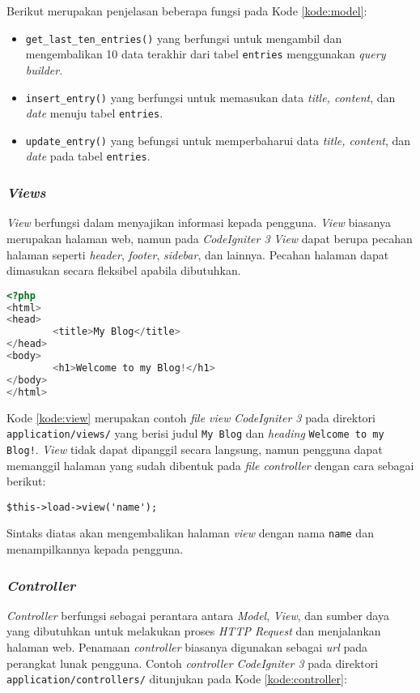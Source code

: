 Berikut merupakan penjelasan beberapa fungsi pada Kode \ref{kode:model}:
\begin{itemize}
\item \verb|get_last_ten_entries()| yang berfungsi untuk mengambil dan mengembalikan 10 data terakhir dari tabel \verb|entries| menggunakan \textit{query builder}.
\item \verb|insert_entry()| yang berfungsi untuk memasukan data \textit{title, content}, dan \textit{date} menuju tabel \verb|entries|.
\item \verb|update_entry()| yang befungsi untuk memperbaharui data \textit{title, content}, dan \textit{date} pada tabel \verb|entries|.
\end{itemize}

\subsubsection{\textit{\textbf{Views}}}
\textit{View} berfungsi dalam menyajikan informasi kepada pengguna. \textit{View} biasanya merupakan halaman web, namun pada \textit{CodeIgniter 3} \textit{View} dapat berupa pecahan halaman seperti \textit{header}, \textit{footer}, \textit{sidebar}, dan lainnya. Pecahan halaman dapat dimasukan secara fleksibel apabila dibutuhkan.

\begin{lstlisting}[language=PHP, caption=Contoh \textit{view} pada \textit{CodeIgniter 3}, label=kode:view]
<?php
<html>
<head>
        <title>My Blog</title>
</head>
<body>
        <h1>Welcome to my Blog!</h1>
</body>
</html>
\end{lstlisting}

Kode \ref{kode:view} merupakan contoh \textit{file view} \textit{CodeIgniter 3} pada direktori \verb|application/views/| yang berisi judul \texttt{My Blog} dan \textit{heading} \texttt{Welcome to my Blog!}. \textit{View} tidak dapat dipanggil secara langsung, namun pengguna dapat memanggil halaman yang sudah dibentuk pada \textit{file controller} dengan cara sebagai berikut:

\begin{center}
\verb|$this->load->view('name');|
\end{center}

Sintaks diatas akan mengembalikan halaman \textit{view} dengan nama \texttt{name} dan menampilkannya kepada pengguna.

\subsubsection{\textit{\textbf{Controller}}} 
\textit{Controller} berfungsi sebagai perantara antara \textit{Model}, \textit{View}, dan sumber daya yang dibutuhkan untuk melakukan proses \textit{HTTP Request} dan menjalankan halaman web. Penamaan \textit{controller} biasanya digunakan sebagai \textit{url} pada perangkat lunak pengguna. Contoh \textit{controller} \textit{CodeIgniter 3} pada direktori \verb|application/controllers/| ditunjukan pada Kode \ref{kode:controller}:

